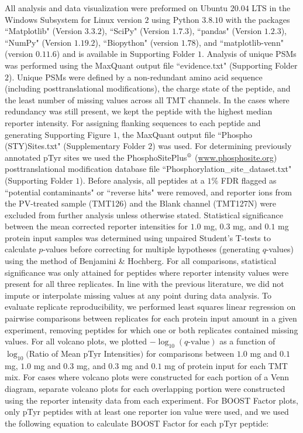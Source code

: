 \documentclass[journal=jprobs,manuscript=article]{achemso}
\begin{document}
All analysis and data visualization were preformed on Ubuntu $20.04$ LTS in the Windows Subsystem for Linux version $2$ using Python $3.8.10$ with the packages ``Matplotlib" (Version $3.3.2$), ``SciPy" (Version $1.7.3$), ``pandas" (Version $1.2.3$), ``NumPy" (Version $1.19.2$), ``Biopython" (version $1.78$), and ``matplotlib-venn" (version $0.11.6$) and is available in Supporting Folder $1$. Analysis of unique PSMs was performed using the MaxQuant output file ``evidence.txt" (Supporting Folder $2$). Unique PSMs were defined by a non-redundant amino acid sequence (including posttranslational modifications), the charge state of the peptide, and the least number of missing values across all TMT channels. In the cases where redundancy was still present, we kept the peptide with the highest median reporter intensity. For assigning flanking sequences to each peptide and generating Supporting Figure $1$, the MaxQuant output file ``Phospho (STY)Sites.txt" (Supplementary Folder $2$) was used. For determining previously annotated pTyr sites we used the PhosphoSitePlus$^{\text{\textregistered}}$ (\href{www.phosphosite.org}{www.phosphosite.org})\cite{hornbeck2015phosphositeplus} posttranslational modification database file ``Phosphorylation\_site\_dataset.txt" (Supporting Folder $1$). Before analysis, all peptides at a $1\%$ FDR flagged as ``potential contaminants" or ``reverse hits" were removed, and reporter ions from the PV-treated sample (TMT126) and the Blank channel (TMT127N) were excluded from further analysis unless otherwise stated. Statistical significance between the mean corrected reporter intensities for $1.0$ mg, $0.3$ mg, and $0.1$ mg protein input samples was determined using unpaired Student's T-tests to calculate $p$-values before correcting for multiple hypotheses (generating $q$-values) using the method of Benjamini \& Hochberg\cite{benjhoch}. For all comparisons, statistical significance was only attained for peptides where reporter intensity values were present for all three replicates. In line with the previous literature, we did not impute or interpolate missing values at any point during data analysis\cite{chua2020tandem,chua2021ovalbumin}. To evaluate replicate reproducibility, we performed least squares linear regression\cite{grus2019data} on pairwise comparisons between replicates for each protein input amount in a given experiment, removing peptides for which one or both replicates contained missing values. For all volcano plots, we plotted $-\log_{10}(q\text{-value})$ as a function of $\log_{10}($Ratio of Mean pTyr Intensities$)$ for comparisons between $1.0$ mg and $0.1$ mg, $1.0$ mg and $0.3$ mg, and $0.3$ mg and $0.1$ mg of protein input for each TMT mix. For cases where volcano plots were constructed for each portion of a Venn diagram, separate volcano plots for each overlapping portion were constructed using the reporter intensity data from each experiment. For BOOST Factor plots, only pTyr peptides with at least one reporter ion value were used, and we used the following equation to calculate BOOST Factor for each pTyr peptide:
\end{document}
